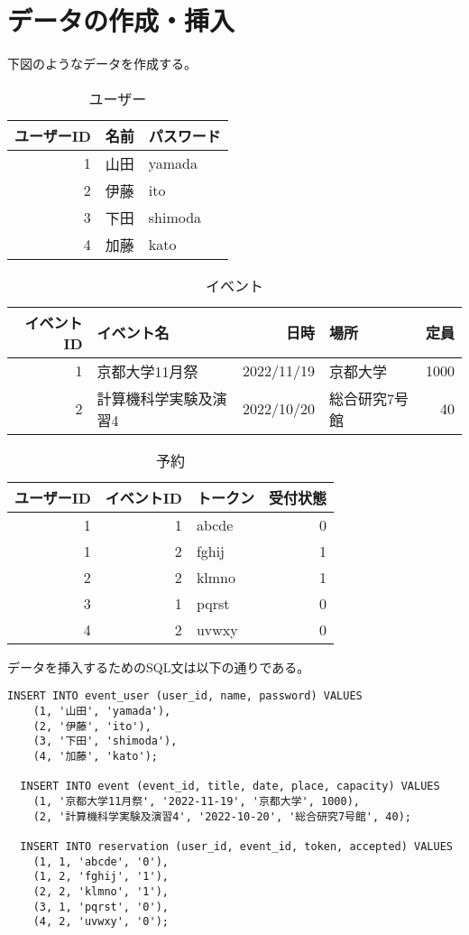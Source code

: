 \documentclass[dvipdfmx]{jarticle}
\begin{document}
\section{データの作成・挿入}

下図のようなデータを作成する。

\begin{table}[H]
  \centering
   \begin{tabular}{|r|l|l|}
    \hline
    ユーザーID & 名前 & パスワード \\
    \hline \hline
    1 & 山田 & yamada \\
    2 & 伊藤 & ito \\
    3 & 下田 & shimoda \\
    4 & 加藤 & kato \\
    \hline
  \end{tabular}
  \caption{ユーザー}
\end{table}

\begin{table}[H]
  \centering
   \begin{tabular}{|r|l|r|l|r|}
    \hline
    イベントID & イベント名 & 日時 & 場所 & 定員 \\
    \hline \hline
    1 & 京都大学11月祭 & 2022/11/19 & 京都大学 & 1000 \\
    2 & 計算機科学実験及演習4 & 2022/10/20 & 総合研究7号館 & 40 \\
    \hline
  \end{tabular}
  \caption{イベント}
\end{table}

\begin{table}[H]
  \centering
   \begin{tabular}{|r|r|l|r|}
    \hline
    ユーザーID & イベントID & トークン & 受付状態 \\
    \hline \hline
    1 & 1 & abcde & 0 \\
    1 & 2 & fghij & 1 \\
    2 & 2 & klmno & 1 \\
    3 & 1 & pqrst & 0 \\
    4 & 2 & uvwxy & 0 \\
    \hline
  \end{tabular}
  \caption{予約}
\end{table}

データを挿入するためのSQL文は以下の通りである。

\begin{lstlisting}[caption=insertion]
  INSERT INTO event_user (user_id, name, password) VALUES 
    (1, '山田', 'yamada'),
    (2, '伊藤', 'ito'),
    (3, '下田', 'shimoda'),
    (4, '加藤', 'kato');

  INSERT INTO event (event_id, title, date, place, capacity) VALUES 
    (1, '京都大学11月祭', '2022-11-19', '京都大学', 1000),
    (2, '計算機科学実験及演習4', '2022-10-20', '総合研究7号館', 40);

  INSERT INTO reservation (user_id, event_id, token, accepted) VALUES 
    (1, 1, 'abcde', '0'),
    (1, 2, 'fghij', '1'),
    (2, 2, 'klmno', '1'),
    (3, 1, 'pqrst', '0'),
    (4, 2, 'uvwxy', '0');
\end{lstlisting}
\end{document}
